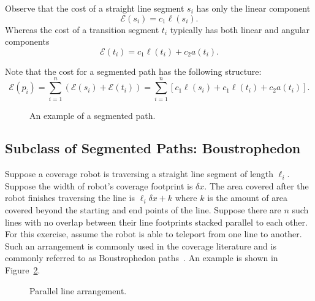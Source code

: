 \documentclass[../main.tex]{subfiles}
\begin{document}
\begin{remark}
	Observe that the cost of a straight line segment $s_i$ has only the linear component
	\begin{equation}
		\mathcal{E}(s_i)=c_1\ell(s_i).
	\end{equation}
	Whereas the cost of a transition segment $t_i$ typically has both linear and angular components
	\begin{equation}
		\mathcal{E}(t_i)=c_1\ell(t_i)+c_2a(t_i).
	\end{equation}
	\RE
\end{remark}

Note that the cost for a segmented path has the following structure:
\begin{equation}
	\label{eq:segmented_cost}
	\mathcal{E}(p_i)=\sum_{i=1}^n(\mathcal{E}(s_i)+\mathcal{E}(t_i))=\sum_{i=1}^n[c_1\ell(s_i)+c_1\ell(t_i)+c_2a(t_i)].
\end{equation}

\begin{figure}
	\centering
	
	\caption{An example of a segmented path.}
	\label{fig:segmented}
\end{figure}


\subsection{Subclass of Segmented Paths: Boustrophedon}
\label{subsection:boustrophedon_type_path}

Suppose a coverage robot is traversing a straight line segment of length $\ell_i$. Suppose the width of robot's coverage footprint is $\delta x$. The area covered after the robot finishes traversing the line is $\ell_i\delta x+k$ where $k$ is the amount of area covered beyond the starting and end points of the line. Suppose there are $n$ such lines with no overlap between their line footprints stacked parallel to each other. For this exercise, assume the robot is able to teleport from one line to another. Such an arrangement is commonly used in the coverage literature and is commonly referred to as Boustrophedon paths~\cite{Choset1998coverage}. An example is shown in Figure~\ref{fig:riemann_sum}.

\begin{figure}
	\centering
	
	\caption{Parallel line arrangement.}
	\label{fig:riemann_sum}
\end{figure}
\end{document}
